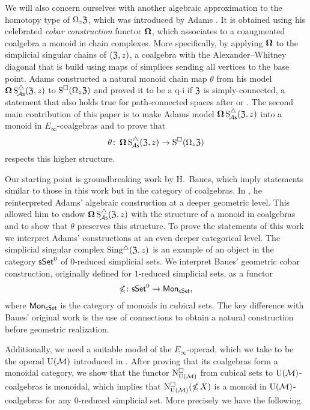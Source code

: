We will also concern ourselves with another algebraic approximation to the homotopy type of $\Omega_z \mathfrak{Z}$, which was introduced by Adams \cite{adams1956cobar}.
It is obtained using his celebrated \textit{cobar construction} functor $\operatorname{\mathbf{\Omega}}$, which associates to a coaugmented coalgebra a monoid in chain complexes.
More specifically, by applying $\operatorname{\mathbf{\Omega}}$ to the simplicial singular chains of $(\mathfrak{Z}, z)$, a coalgebra with the Alexander--Whitney diagonal that is build using maps of simplices sending all vertices to the base point.
Adams constructed a natural monoid chain map $\theta$ from his model $\operatorname{\mathbf{\Omega}} \operatorname{S^{\triangle}_{\!{\mathcal{A}\mathsf{s}}}}(\mathfrak{Z}, z)$ to $\operatorname{S^{\square}}(\Omega_z \mathfrak{Z})$ and proved it to be a q-i if $\mathfrak{Z}$ is simply-connected, a statement that also holds true for path-connected spaces after \cite{hess2010cobar} or \cite{rivera2018cubical}.
The second main contribution of this paper is to make Adams model $\operatorname{\mathbf{\Omega}} \operatorname{S^{\triangle}_{\!{\mathcal{A}\mathsf{s}}}}(\mathfrak{Z}, z)$ into a monoid in $E_\infty$-coalgebras and to prove that
\[
\theta \colon \operatorname{\mathbf{\Omega}} \operatorname{S^{\triangle}_{\!{\mathcal{A}\mathsf{s}}}}(\mathfrak{Z}, z) \to \operatorname{S^{\square}}(\Omega_z \mathfrak{Z})
\]
respects this higher structure.

Our starting point is groundbreaking work by H.~Baues, which imply statements similar to those in this work but in the category of coalgebras.
In \cite{baues1998hopf}, he reinterpreted Adams' algebraic construction at a deeper geometric level.
This allowed him to endow $\operatorname{\mathbf{\Omega}} \operatorname{S^{\triangle}_{\!{\mathcal{A}\mathsf{s}}}}(\mathfrak{Z}, z)$ with the structure of a monoid in coalgebras and to show that $\theta$ preserves this structure.
To prove the statements of this work we interpret Adams' constructions at an even deeper categorical level.
The simplicial singular complex $\operatorname{Sing^{\triangle}}(\mathfrak{Z}, z)$ is an example of an object in the category $\mathsf{sSet}^0$ of $0$-reduced simplicial sets.
We interpret Baues' geometric cobar construction, originally defined for $1$-reduced simplicial sets, as a functor
\begin{equation*}
	\operatorname{\mathbb{\Omega}} \colon \mathsf{sSet}^0 \to \mathsf{Mon}_{\mathsf{cSet}},
\end{equation*}
where $\mathsf{Mon}_{\mathsf{cSet}}$ is the category of monoids in cubical sets.
The key difference with Baues' original work is the use of connections to obtain a natural construction before geometric realization.

Additionally, we need a suitable model of the $E_\infty$-operad, which we take to be the operad ${\operatorname{U}(\mathcal{M})}$ introduced in \cite{medina2020prop1}.
After proving that its coalgebras form a monoidal category, we show that the functor $\operatorname{N^{\square}_{{\operatorname{U}(\mathcal{M})}}}$ from cubical sets to ${\operatorname{U}(\mathcal{M})}$-coalgebras is monoidal, which implies that $\operatorname{N^{\square}_{{\operatorname{U}(\mathcal{M})}}} (\operatorname{\mathbb{\Omega}} X)$ is a monoid in ${\operatorname{U}(\mathcal{M})}$-coalgebras for any 0-reduced simplicial set.
More precisely we have the following.

